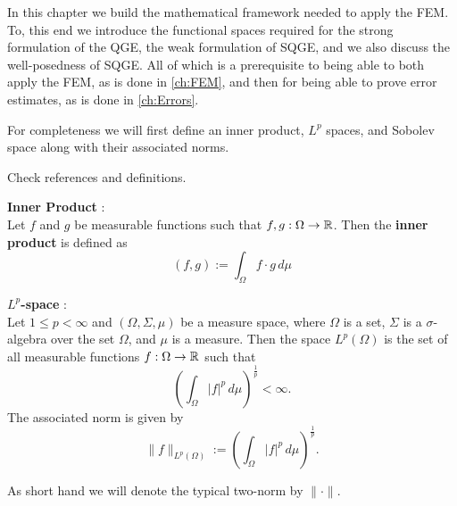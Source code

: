 In this chapter we build the mathematical framework needed to apply the FEM. To,
this end we introduce the functional spaces required for the strong formulation
of the QGE, the weak formulation of SQGE, and we also discuss the well-posedness
of SQGE. All of which is a prerequisite to being able to both apply the FEM, as
is done in \autoref{ch:FEM}, and then for being able to prove error estimates,
as is done in \autoref{ch:Errors}.

For completeness we will first define an inner product, $L^p$ spaces, and
Sobolev space along with their associated norms.

{\color{red} {\LARGE Check references and definitions.}
\begin{definition} \label{def:InnerProduct}
  \textbf{Inner Product} \cite{Royden2010}: \\
  Let $f$ and $g$ be measurable functions such that $f,g : \Omega \rightarrow \mathbb{R}$.
  Then the \textbf{inner product} is defined as
  \begin{equation}
    (f,g) := \int_{\Omega}\! f \cdot g\, d\mu
    \label{eqn:InnerProduct}
  \end{equation}
\end{definition}

\begin{definition} \label{def:LpSpace}
  \textbf{$L^p$-space} \cite{Royden2010}: \\
  Let $1\le p < \infty$ and $(\Omega, \Sigma, \mu)$ be a measure space, where
  $\Omega$ is a set, $\Sigma$ is a $\sigma$-algebra over the set $\Omega$, and
  $\mu$ is a measure. Then the space $L^p(\Omega)$ is the set of all measurable
  functions $f : \Omega \rightarrow \mathbb{R}$ such that
  \begin{equation}
    \left(\int_{\Omega}\! |f|^p\, d\mu\right)^{\frac{1}{p}} < \infty.
    \label{eqn:LP}
  \end{equation}
  The associated norm is given by
  \begin{equation}
    \|f\|_{L^p(\Omega)} := \left(\int_{\Omega}\! |f|^p\, d\mu\right)^{\frac{1}{p}}.
    \label{eqn:LPNorm}
  \end{equation}
\end{definition}
As short hand we will denote the typical two-norm by $\|\cdot\|$.

}
